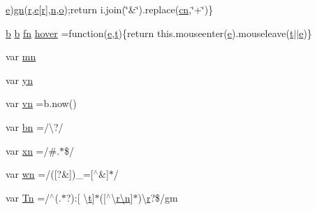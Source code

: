 \begin{DoxyCompactItemize}
\hyperlink{static_2root_2js_2jquery-ui_8custom_8min_8js_abea95a4e94bc6f4151d5683d4c12c3f4}{e})\hyperlink{jquery_8min_8js_a52b2392dd08654e3e724f72921390090}{gn}(\hyperlink{static_2root_2js_2jquery-1_811_81_8min_8js_a96f65b399314d93896076ceb474b6b9b}{r},\hyperlink{static_2root_2js_2jquery-ui_8custom_8min_8js_abea95a4e94bc6f4151d5683d4c12c3f4}{e}\mbox{[}\hyperlink{static_2root_2js_2jquery-1_811_81_8min_8js_a96f65b399314d93896076ceb474b6b9b}{r}\mbox{]},\hyperlink{static_2root_2js_2intro_8min_8js_afc984c4f6c68ce30a0af99006f5f8d27}{n},\hyperlink{jquery_8min_8js_ae47ca7a09cf6781e29634502345930a7}{o});return i.\-join(\char`\"{}\&\char`\"{}).replace(\hyperlink{jquery_8min_8js_a43c2bda2537661fb64e62fdfdcea1560}{cn},\char`\"{}+\char`\"{})\}
\item 
\hyperlink{quill_8min_8js_ae02349c58306210e3fd20abc63482e9a}{b} \hyperlink{quill_8min_8js_ae02349c58306210e3fd20abc63482e9a}{b} \hyperlink{static_2root_2js_2jquery-ui_8custom_8min_8js_a6b994a5676f34c0707c73fcd2a61d65d}{fn} \hyperlink{jquery-1_89_81_8min_8js_add99365d995edf0ce49a1f5dd84961b5}{hover} =function(\hyperlink{static_2root_2js_2jquery-ui_8custom_8min_8js_abea95a4e94bc6f4151d5683d4c12c3f4}{e},\hyperlink{static_2root_2js_2bootstrap_2jquery-ui-1_810_84_8custom_8min_8js_acf335ef347969ef6dc8387e680fb289e}{t})\{return this.\-mouseenter(\hyperlink{static_2root_2js_2jquery-ui_8custom_8min_8js_abea95a4e94bc6f4151d5683d4c12c3f4}{e}).mouseleave(\hyperlink{static_2root_2js_2bootstrap_2jquery-ui-1_810_84_8custom_8min_8js_acf335ef347969ef6dc8387e680fb289e}{t}$\vert$$\vert$\hyperlink{static_2root_2js_2jquery-ui_8custom_8min_8js_abea95a4e94bc6f4151d5683d4c12c3f4}{e})\}
\item 
var \hyperlink{jquery-1_89_81_8min_8js_a227fb8e4dbaed5a772526c7e9bb0795f}{mn}
\item 
var \hyperlink{jquery-1_89_81_8min_8js_a390d7ca752a48e31e8ffb5209c0a4cd6}{yn}
\item 
var \hyperlink{jquery-1_89_81_8min_8js_a4d3ea42bab8c1a36105c29b5a098a050}{vn} =b.\-now()
\item 
var \hyperlink{jquery-1_89_81_8min_8js_ac1a6899002e156376de301d5f5fa36d8}{bn} =/\textbackslash{}?/
\item 
var \hyperlink{jquery-1_89_81_8min_8js_a5d600963c6441f15f548bc0b847b6a04}{xn} =/\#.$\ast$\$/
\item 
var \hyperlink{jquery-1_89_81_8min_8js_aaa87ec69cc4d144180280e906cac73f1}{wn} =/(\mbox{[}?\&\mbox{]})\-\_\-=\mbox{[}$^\wedge$\&\mbox{]}$\ast$/
\item 
var \hyperlink{jquery-1_89_81_8min_8js_a2a743fa90b7bc233019c5b720ccde5cc}{Tn} =/$^\wedge$(.$\ast$?)\-:\mbox{[} \textbackslash{}\hyperlink{static_2root_2js_2bootstrap_2jquery-ui-1_810_84_8custom_8min_8js_acf335ef347969ef6dc8387e680fb289e}{t}\mbox{]}$\ast$(\mbox{[}$^\wedge$\textbackslash{}\hyperlink{static_2root_2js_2intro_8min_8js_afc984c4f6c68ce30a0af99006f5f8d27}{r\textbackslash{}n}\mbox{]}$\ast$)\textbackslash{}\hyperlink{static_2root_2js_2jquery-1_811_81_8min_8js_a96f65b399314d93896076ceb474b6b9b}{r}?\$/gm

\end{DoxyCompactItemize}
